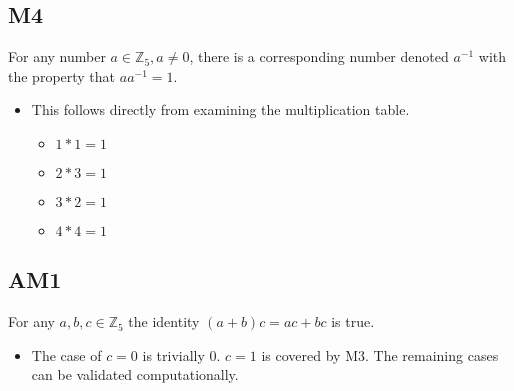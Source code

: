 \documentclass{article}
\begin{document}
\subsection{M4}

For any number $a\in\mathbb{Z}_5, a\neq0$, there is a corresponding number denoted $a^{-1}$ with the property that $aa^{-1}=1$.

\begin{itemize}
    \item This follows directly from examining the multiplication table.
    \begin{itemize}
        \item[\ding{217}] $1*1=1$
        \item[\ding{217}] $2*3=1$
        \item[\ding{217}] $3*2=1$
        \item[\ding{217}] $4*4=1$
    \end{itemize}
\end{itemize}

\subsection{AM1}

For any $a, b, c \in\mathbb{Z}_5$ the identity $(a+b)c=ac +bc$ is true.

\begin{itemize}
	\item The case of $c=0$ is trivially 0. $c=1$ is covered by M3.  The remaining cases can be validated computationally.
\end{itemize}
\end{document}
